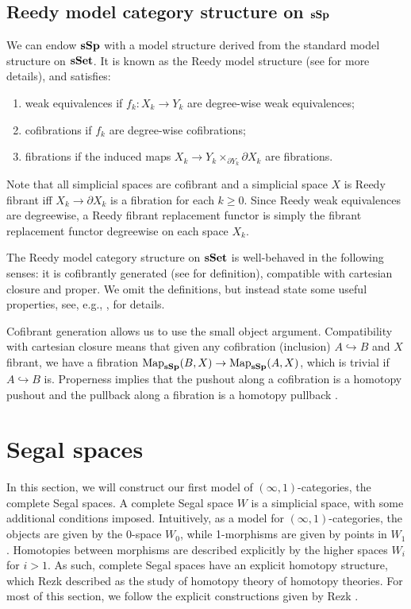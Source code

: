 \begin{refsection}
\subsection{Reedy model category structure on $\mathbf{sSp}$}
We can endow $\mathbf{sSp}$ with a model structure derived from the standard model structure on $\mathbf{sSet}$. It is known as the Reedy model structure (see \cite[IV.3.2]{goerss-jardine-simplicial-homotopy-theory} for more details), and satisfies:
\begin{enumerate}
\item weak equivalences if $f_k:X_k\to Y_k$ are degree-wise weak equivalences;
\item cofibrations if $f_k$ are degree-wise cofibrations;
\item fibrations if the induced maps $X_k\to Y_k\times_{\partial Y_k}\partial X_k$ are fibrations.
\end{enumerate}
Note that all simplicial spaces are cofibrant and a simplicial space $X$ is Reedy fibrant iff $X_k\to\partial X_k$ is a fibration for each $k\ge 0$. Since Reedy weak equivalences are degreewise, a Reedy fibrant replacement functor is simply the fibrant replacement functor degreewise on each space $X_k$.

The Reedy model category structure on $\mathbf{sSet}$ is well-behaved in the following senses: it is cofibrantly generated (see \cite{hirschhorn-model-categories} for definition), compatible with cartesian closure and proper. We omit the definitions, but instead state some useful properties, see, e.g., \cite{hirschhorn-model-categories}, for details.  

Cofibrant generation allows us to use the small object argument. Compatibility with cartesian closure means that given any cofibration (inclusion) $A\hookrightarrow B$ and $X$ fibrant, we have a fibration $\operatorname{\mathrm{Map}}_{\mathbf{sSp}}(B,X)\to\operatorname{\mathrm{Map}}_{\mathbf{sSp}}(A,X)$, which is trivial if $A\hookrightarrow B$ is. Properness implies that the pushout along a cofibration is a homotopy pushout and the pullback along a fibration is a homotopy pullback \cite[Prop A.2.2.4]{lurie-higher-topos-theory}.

\section{Segal spaces}
In this section, we will construct our first model of $(\infty,1)$-categories, the complete Segal spaces. A complete Segal space $W$ is a simplicial space, with some additional conditions imposed. Intuitively, as a model for $(\infty,1)$-categories, the objects are given by the 0-space $W_0$, while 1-morphisms are given by points in $W_1$. Homotopies between morphisms are described explicitly by the higher spaces $W_i$ for $i>1$. As such, complete Segal spaces have an explicit homotopy structure, which Rezk described as the study of homotopy theory of homotopy theories. For most of this section, we follow the explicit constructions given by Rezk \cite{rezk-a-model-for-the-homotopy-theory-of-homotopy-theories}.


\end{refsection}
